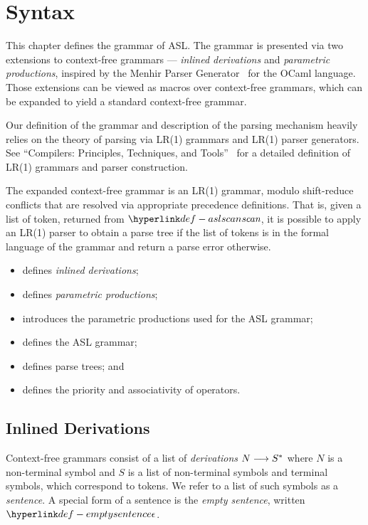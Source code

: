 \chapter{Syntax\label{chap:Syntax}}

This chapter defines the grammar of ASL. The grammar is presented via two extensions
to context-free grammars --- \emph{inlined derivations} and \emph{parametric productions},
inspired by the Menhir Parser Generator~\cite{MenhirManual} for the OCaml language.
Those extensions can be viewed as macros over context-free grammars, which can be
expanded to yield a standard context-free grammar.

Our definition of the grammar and description of the parsing mechanism heavily relies
on the theory of parsing via LR(1) grammars and LR(1) parser generators.
%
See ``Compilers: Principles, Techniques, and Tools''~\cite{ASU86} for a detailed
definition of LR(1) grammars and parser construction.

The expanded context-free grammar is an LR(1) grammar, modulo shift-reduce
conflicts that are resolved via appropriate precedence definitions.
That is, given a list of token, returned from $\aslscan$, it is possible to apply
an LR(1) parser to obtain a parse tree if the list of tokens is in the formal language
of the grammar and return a parse error otherwise.

\ChapterOutline
\begin{itemize}
  \item {} defines \emph{inlined derivations};
  \item {} defines \emph{parametric productions};
  \item {} introduces the parametric productions used for the ASL grammar;
  \item {} defines the ASL grammar;
  \item {} defines parse trees; and
  \item {} defines the priority and associativity of operators.
\end{itemize}

\section{Inlined Derivations\label{sec:InlinedDerivations}}
Context-free grammars consist of a list of \emph{derivations} $N \longrightarrow S^*$
where $N$ is a non-terminal symbol and $S$ is a list of non-terminal symbols and terminal symbols,
which correspond to tokens.
We refer to a list of such symbols as a \emph{sentence}.
\hypertarget{def-emptysentence}{}
A special form of a sentence is the \emph{empty sentence}, written $\emptysentence$.

